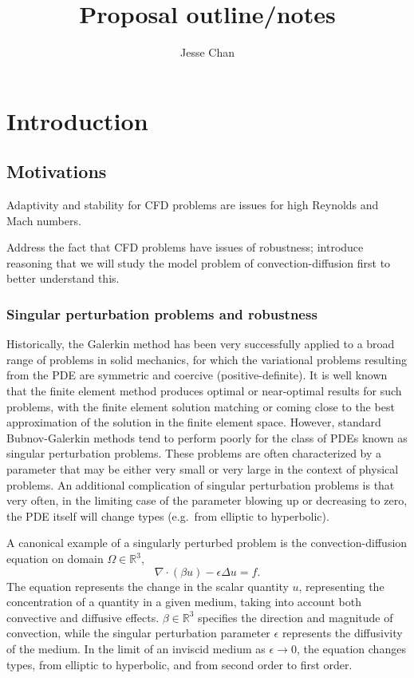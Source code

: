 \documentclass{report}
\date{}
\author{Jesse Chan}
\title{Proposal outline/notes}
\newcommand{\grad}{\nabla}
\renewcommand{\div}{\grad \cdot}
\begin{document}
\tableofcontents
\maketitle

\chapter{Introduction}

\section{Motivations}

Adaptivity and stability for CFD problems are issues for high Reynolds and Mach numbers. 

Address the fact that CFD problems have issues of robustness; introduce reasoning that we will study the model problem of convection-diffusion first to better understand this. 

\subsection{Singular perturbation problems and robustness}

Historically, the Galerkin method has been very successfully applied to a broad range of problems in solid mechanics, for which the variational problems resulting from the PDE are symmetric and coercive (positive-definite). It is well known that the finite element method produces optimal or near-optimal results for such problems, with the finite element solution matching or coming close to the best approximation of the solution in the finite element space. However, standard Bubnov-Galerkin methods tend to perform poorly for the class of PDEs known as singular perturbation problems. These problems are often characterized by a parameter that may be either very small or very large in the context of physical problems.  An additional complication of singular perturbation problems is that very often, in the limiting case of the parameter blowing up or decreasing to zero, the PDE itself will change types (e.g.\ from elliptic to hyperbolic).

A canonical example of a singularly perturbed problem is the convection-diffusion equation on domain $\Omega \in \mathbb{R}^3$,
\[
\div \left(\beta u\right) - \epsilon \Delta u = f.
\]
The equation represents the change in the scalar quantity $u$, representing the concentration of a quantity in a given medium, taking into account both convective and diffusive effects. $\beta \in \mathbb{R}^3$ specifies the direction and magnitude of convection, while the singular perturbation parameter $\epsilon$ represents the diffusivity of the medium. In the limit of an inviscid medium as $\epsilon\rightarrow 0$, the equation changes types, from elliptic to hyperbolic, and from second order to first order.
\end{document}
